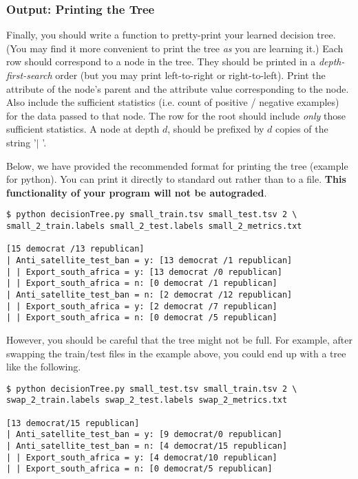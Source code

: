\documentclass[11pt]{article}
\numberwithin{equation}{section} %
\numberwithin{figure}{section} %
\numberwithin{table}{section} %
\begin{document}
\subsubsection{Output: Printing the Tree}
\label{sec:printtree}

Finally, you should write a function to pretty-print your learned decision tree. (You may find it more convenient to print the tree \emph{as} you are learning it.) Each row should correspond to a node in the tree. They should be printed in a \emph{depth-first-search} order (but you may print left-to-right or right-to-left). Print the attribute of the node's parent and the attribute value corresponding to the node. Also include the sufficient statistics (i.e. count of positive / negative examples) for the data passed to that node. The row for the root should include \emph{only} those sufficient statistics. A node at depth $d$, should be prefixed by $d$ copies of the string '$\mid$ '.

Below, we have provided the recommended format for printing the tree (example for python). You can print it directly to standard out rather than to a file. \textbf{This functionality of your program will not be autograded}.

\begin{lstlisting}[language=Shell]
$ python decisionTree.py small_train.tsv small_test.tsv 2 \ 
small_2_train.labels small_2_test.labels small_2_metrics.txt

[15 democrat /13 republican]
| Anti_satellite_test_ban = y: [13 democrat /1 republican]
| | Export_south_africa = y: [13 democrat /0 republican]
| | Export_south_africa = n: [0 democrat /1 republican]
| Anti_satellite_test_ban = n: [2 democrat /12 republican]
| | Export_south_africa = y: [2 democrat /7 republican]
| | Export_south_africa = n: [0 democrat /5 republican]
\end{lstlisting}

However, you should be careful that the tree might not be full. For example, after swapping the train/test files in the example above, you could end up with a tree like the following.

\begin{lstlisting}[language=Shell]
$ python decisionTree.py small_test.tsv small_train.tsv 2 \ 
swap_2_train.labels swap_2_test.labels swap_2_metrics.txt

[13 democrat/15 republican]
| Anti_satellite_test_ban = y: [9 democrat/0 republican]
| Anti_satellite_test_ban = n: [4 democrat/15 republican]
| | Export_south_africa = y: [4 democrat/10 republican]
| | Export_south_africa = n: [0 democrat/5 republican]
\end{lstlisting}
\end{document}
